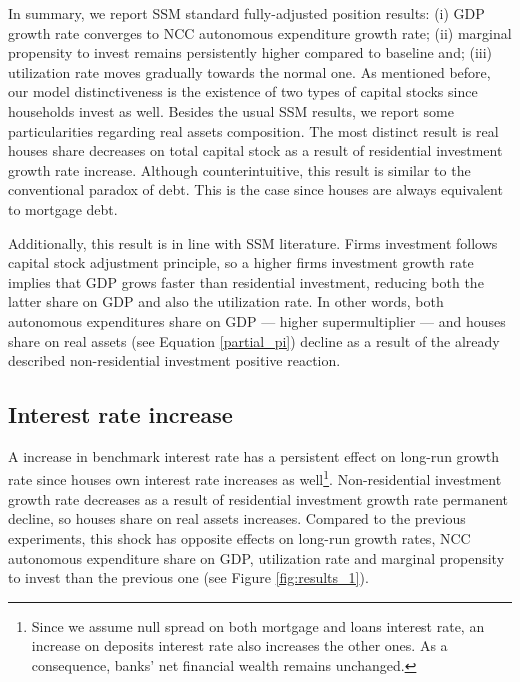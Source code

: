 \documentclass[11pt]{article}
\begin{document}
In summary, we report SSM standard fully-adjusted position results:
    (i) GDP growth rate converges to NCC autonomous expenditure growth rate;
    (ii) marginal propensity to invest remains persistently higher compared to baseline and;
    (iii) utilization rate moves gradually towards the normal one.
As mentioned before, our model distinctiveness is the existence of two types of capital stocks since households invest as well.
Besides the usual SSM results, we report some particularities regarding real assets composition.
The most distinct result is real houses share decreases on total capital stock as a result of residential investment growth rate increase.
Although counterintuitive, this result is similar to the conventional paradox of debt.
This is the case since houses are always equivalent to  mortgage debt.


Additionally, this result is in line with SSM literature.
Firms investment follows capital stock adjustment principle, so a higher firms investment growth rate implies that
GDP grows faster than residential investment, reducing both the latter share on GDP and
also the utilization rate.
In other words, both autonomous expenditures share on GDP --- higher supermultiplier --- and houses share on real assets (see Equation \ref{partial_pi}) decline as a result of the already described non-residential investment positive reaction.
\subsection{Interest rate increase}
\label{sec:orgc2bcc43}
\label{sec:Exp3}

A increase in benchmark interest rate  has a persistent effect on long-run growth rate since houses own interest rate increases as well\footnote{Since we assume null spread on both mortgage and loans interest rate, an increase on deposits interest rate also increases the other ones. As a consequence, banks' net financial wealth remains unchanged.}.
Non-residential investment growth rate decreases as a result of residential investment growth rate permanent decline, so houses share on real assets increases.
Compared to the previous experiments, this shock has opposite effects on long-run growth rates, NCC autonomous expenditure share on GDP, utilization rate and marginal propensity to invest  than the previous one (see Figure \ref{fig:results_1}).
\end{document}
